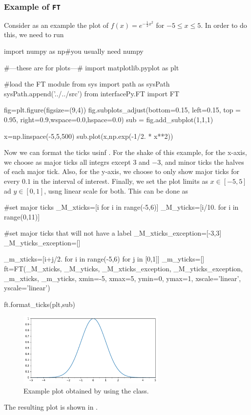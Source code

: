 \documentclass[11pt,a4paper]{article}
\begin{document}
\subsubsection*{Example of {\tt FT}}
%
Consider as an example the plot of $f(x) = e^{-\frac{1}{2}x^2}$ for $-5 \leq x \leq 5$. In order to do this, we need to run 
%
\begin{py}
	import numpy as np#you usually need numpy
	
	#---these are for plots---#
	import matplotlib.pyplot as plt
	
	#load the FT module
	from sys import path as sysPath
	sysPath.append('../../src')
	from interfacePy.FT import FT

	fig=plt.figure(figsize=(9,4))
	fig.subplots_adjust(bottom=0.15, left=0.15, top = 0.95, right=0.9,wspace=0.0,hspace=0.0)
	sub = fig.add_subplot(1,1,1)
	
	x=np.linspace(-5,5,500)
	sub.plot(x,np.exp(-1/2. * x**2))
\end{py}

Now we can format the ticks usinf . For the shake of this example, for the x-axis, we choose as major ticks all integrs except $3$ and $-3$, and minor ticks the halves of each major tick. Also, for the y-axis, we choose to only show major ticks for every $0.1$ in the interval of interest. Finally, we set the plot limits as $x \in [-5,5]$ ad $y \in [0,1]$, usng linear scale for both. This can be done as

\begin{py}
    #set major ticks
	_M_xticks=[i for i in range(-5,6)]
	_M_yticks=[i/10. for i in range(0,11)]
	
	#set major ticks that will not have a label
	_M_xticks_exception=[-3,3]
	_M_yticks_exception=[]
	
	_m_xticks=[i+j/2. for i in range(-5,6) for j in [0,1]]
	_m_yticks=[]  
	ft=FT(_M_xticks, _M_yticks, _M_xticks_exception, _M_yticks_exception, _m_xticks, _m_yticks,
		xmin=-5, xmax=5, ymin=0, ymax=1, xscale='linear', yscale='linear')
	
	ft.format_ticks(plt,sub)    
\end{py}
%
\begin{figure}[t]
	\centering
		\includegraphics[width=0.65\textwidth]{figs/FT_example.pdf}
		\caption{Example plot obtained by using the  class.}
		\label{fig:FT_example}
\end{figure}
%
The resulting plot is shown in .
\end{document}
